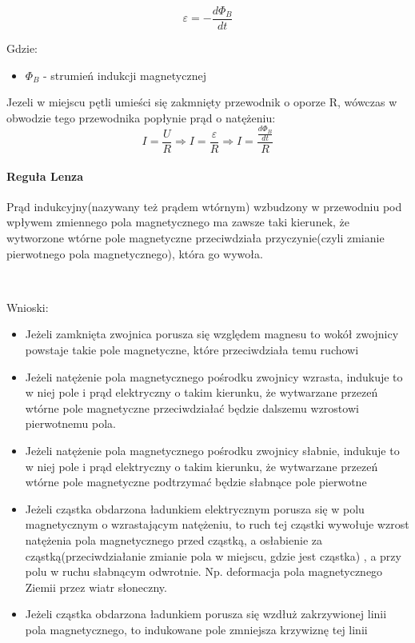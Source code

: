 \documentclass{article}
\begin{document}
            \begin{equation}
                \varepsilon = -\frac{d\Phi_B}{dt}
            \end{equation}

            Gdzie:
            \begin{itemize}
                \item $\Phi_B$ - strumień indukcji magnetycznej
            \end{itemize}

            Jezeli w miejscu pętli umieści się zakmnięty przewodnik o oporze R,
            wówczas w obwodzie tego przewodnika popłynie prąd o natężeniu:
            \begin{equation}
                I = \frac{U}{R} \Longrightarrow I = \frac{\varepsilon}{R} \Longrightarrow
                I = \frac{\frac{d\Phi_B}{dt}}{R}
            \end{equation}

            \paragraph{Reguła Lenza}
            Prąd indukcyjny(nazywany też prądem wtórnym) wzbudzony w przewodniu pod wpływem
            zmiennego pola magnetycznego ma zawsze taki kierunek, że wytworzone wtórne
            pole magnetyczne przeciwdziała przyczynie(czyli zmianie pierwotnego pola magnetycznego),
            która go wywoła.

            \
            
            Wnioski:
            \begin{itemize}
                \item Jeżeli zamknięta zwojnica porusza się względem magnesu to wokół zwojnicy
                powstaje takie pole magnetyczne, które przeciwdziała temu ruchowi
                \item Jeżeli natężenie pola magnetycznego pośrodku zwojnicy wzrasta, indukuje
                to w niej pole i prąd elektryczny o takim kierunku, że wytwarzane przezeń wtórne
                pole magnetyczne przeciwdziałać będzie dalszemu wzrostowi pierwotnemu pola.
                \item Jeżeli natężenie pola magnetycznego pośrodku zwojnicy słabnie, indukuje to w
                niej pole i prąd elektryczny o takim kierunku, że wytwarzane przezeń wtórne
                pole magnetyczne podtrzymać będzie słabnące pole pierwotne
                \item Jeżeli cząstka obdarzona ładunkiem elektrycznym porusza się w polu magnetycznym
                o wzrastającym natężeniu, to ruch tej cząstki wywołuje wzrost natężenia pola magnetycznego
                przed cząstką, a osłabienie za cząstką(przeciwdziałanie zmianie pola w miejscu, gdzie jest cząstka)
                , a przy polu w ruchu słabnącym odwrotnie. Np. deformacja pola magnetycznego
                Ziemii przez wiatr słoneczny.
                \item Jeżeli cząstka obdarzona ładunkiem porusza się wzdłuż zakrzywionej linii pola
                magnetycznego, to indukowane pole zmniejsza krzywiznę tej linii 
            \end{itemize}
\end{document}
